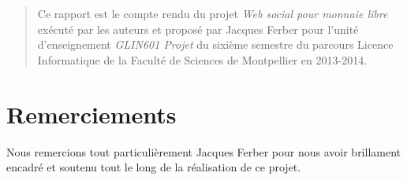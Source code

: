 \maketitle

\begin{abstract}
Ce rapport est le compte rendu du projet \emph{Web social pour monnaie libre} exécuté par les auteurs et proposé par Jacques Ferber pour l'unité d'enseignement \emph{GLIN601 Projet} du sixième semestre du parcours Licence Informatique de la Faculté de Sciences de Montpellier en 2013-2014.
\end{abstract}

\chapter*{Remerciements}
Nous remercions tout particulièrement Jacques Ferber pour nous avoir brillament encadré et soutenu tout le long de la réalisation de ce projet.

\tableofcontents

%

\appendix

%

